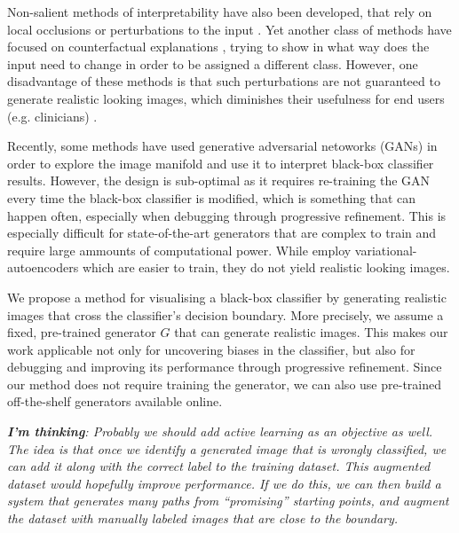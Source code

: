 \documentclass{article}
\begin{document}
Non-salient methods of interpretability have also been developed, that rely on local occlusions or perturbations to the input \cite{zhou2014object,fong2017interpretable}. Yet another class of methods have focused on counterfactual explanations \cite{wachter2017counterfactual,goyal2019counterfactual}, trying to show in what way does the input need to change in order to be assigned a different class. However, one disadvantage of these methods is that such perturbations are not guaranteed to generate realistic looking images, which diminishes their usefulness for end users (e.g. clinicians) \cite{singla2019explanation}.

Recently, some methods \cite{singla2019explanation,samangouei2018explaingan,liu2019generative} have used generative adversarial netoworks (GANs) in order to explore the image manifold and use it to interpret black-box classifier results. However, the design is sub-optimal as it requires re-training the GAN every time the black-box classifier is modified, which is something that can happen often, especially when debugging through progressive refinement. This is especially difficult for state-of-the-art \cite{karras2019style,brock2018large} generators that are complex to train and require large ammounts of computational power. While \cite{joshi2018xgems} employ variational-autoencoders which are easier to train, they do not yield realistic looking images.

We propose a method for visualising a black-box classifier by generating realistic images that cross the classifier's decision boundary. More precisely, we assume a fixed, pre-trained generator $G$ that can generate realistic images. This makes our work applicable not only for uncovering biases in the classifier, but also for debugging and improving its performance through progressive refinement. Since our method does not require training the generator, we can also use pre-trained off-the-shelf generators available online. 

\emph{\textbf{I'm thinking}: Probably we should add active learning as an objective as well. The idea is that once we identify a generated image that is wrongly classified, we can add it along with the correct label to the training dataset. This augmented dataset would hopefully improve performance. If we do this, we can then build a system that generates many paths from ``promising'' starting points, and augment the dataset with manually labeled images that are close to the boundary.}


\newcommand{\bz}{\textbf{z}}
\end{document}
